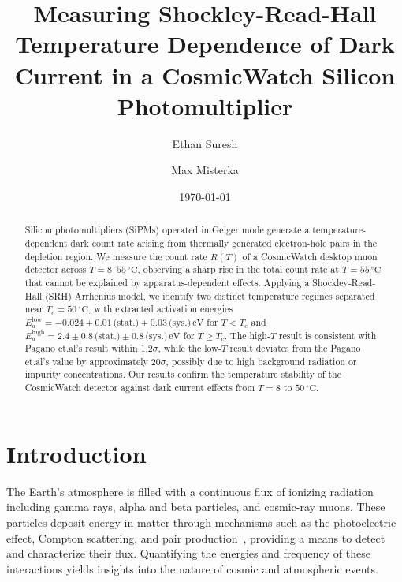 \documentclass[aps,twocolumn,secnumarabic,balancelastpage,amsmath,amssymb,nofootinbib,floatfix]{revtex4-1}
\begin{document}
\title{Measuring Shockley-Read-Hall Temperature Dependence of Dark Current in a CosmicWatch Silicon Photomultiplier}
\author{Ethan Suresh}
\author{Max Misterka}

\date{\today}


\begin{abstract}
Silicon photomultipliers (SiPMs) operated in Geiger mode generate a temperature-dependent dark count rate arising from thermally generated electron-hole pairs in the depletion region. We measure the count rate $R(T)$ of a CosmicWatch 
desktop muon detector across $T = 8$--$55\,^{\circ}\text{C}$, observing a sharp rise in the total count rate at $T = 55\,^{\circ}\text{C}$ that cannot be explained by apparatus-dependent effects. 
Applying a Shockley-Read-Hall (SRH) Arrhenius model, we identify two distinct temperature regimes separated near $T_c = 50\,^{\circ}\text{C}$, 
with extracted activation energies $E_a^{\mathrm{low}} = -0.024 \pm 0.01\,\text{(stat.)} \pm 0.03\,\text{(sys.)}\,\text{eV}$ for $T < T_c$ and $E_a^{\mathrm{high}} = 2.4 \pm 0.8\,\text{(stat.)} \pm 0.8\,\text{(sys.)}\,\text{eV}$ for $T \geq T_c$. The high-$T$ result is consistent 
with Pagano et.al's result within 1.2$\sigma$, while the low-$T$ result deviates from the Pagano et.al's value by approximately $20\sigma$, possibly due to high background radiation or impurity concentrations. Our results confirm the temperature stability of the 
CosmicWatch detector against dark current effects from $T = 8$ to $50\,^{\circ}\text{C}$.
\end{abstract}

\maketitle


\section{Introduction}

The Earth's atmosphere is filled with a continuous flux of ionizing radiation including gamma rays, alpha and beta particles, and cosmic-ray muons. These particles deposit energy in matter through mechanisms such as the photoelectric effect, Compton scattering, and pair production~\cite{cosmicwatch_manual}, providing a means to detect and characterize their flux. Quantifying the energies and frequency of these interactions yields insights into the nature of cosmic and atmospheric events.
\end{document}

